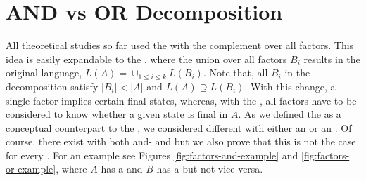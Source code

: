 \chapter{AND vs OR Decomposition}
\label{chap:and-vs-or}
All theoretical studies so far used the \andDecomp with the complement over all factors.
This idea is easily expandable to the \orDecomp, where the union over all factors $B_i$ results in the original language, $L(A) = \cup_{1\leq i \leq k} L(B_i)$.
Note that, all $B_i$ in the decomposition satisfy $|B_i| < |A|$ and $L(A) \supseteq L(B_i)$.
With this change, a single factor implies certain final states, whereas, with the \andDecomp, all factors have to be considered to know whether a given state is final in $A$.
As we defined the \orDecomp as a conceptual counterpart to the \andDecomp, we considered different \DFAs with either an \andDecomp or an \orDecomp.
Of course, there exist \DFAs with both and- and \orDecomp but we also prove that this is not the case for every \DFA.
For an example see Figures \ref{fig:factors-and-example} and \ref{fig:factors-or-example}, where $A$ has a \andDecomp and $B$ has a \orDecomp but not vice versa.

